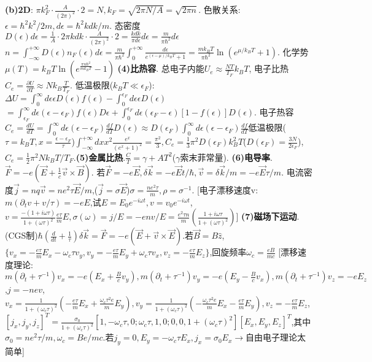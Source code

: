 \documentclass[UTF8,a4paper,10pt,twocolumn]{ctexart}
\begin{document}
 \textbf{(b)2D}:
  $\pi k_F^2\cdot\frac{A}{(2\pi)^2}\cdot 2=N,k_F=\sqrt{2\pi N/A}=\sqrt{2\pi n}$.
  色散关系:$\epsilon=\hbar^2 k^2/2m,d\epsilon=\hbar^2kdk/m$.
  态密度$D(\epsilon)d\epsilon=\frac{1}{A}\cdot2\pi kdk\cdot\frac{A}{(2\pi)^2}\cdot 2=\frac{kdk}{\pi d\epsilon}d\epsilon=\frac{m}{\pi\hbar^2}d\epsilon$$n=\int_{-\infty}^{+\infty}D(\epsilon)n_F(\epsilon)d\epsilon=\frac{m}{\pi\hbar^2}\int_{0}^{+\infty}\frac{d\epsilon}{e^{(\epsilon-\mu)/k_BT}+1}$$=\frac{mk_BT}{\pi\hbar^2}\ln{(e^{\mu/k_BT}+1)}$.
  化学势$\mu(T)=k_BT\ln(e^{\frac{\pi n \hbar^2}{mk_BT}}-1)$
  \textbf{(4)比热容}.
  总电子内能$U_{e}\approx\frac{NT}{T_F}k_B T$,
  电子比热$C_{e}=\frac{\partial U}{\partial T}\approx Nk_B \frac{T}{T_F}$.
  低温极限($k_B T\ll \epsilon_F$):$\Delta U=\int_0^{\infty}d\epsilon\epsilon D(\epsilon)f(\epsilon)-\int_0^{\epsilon_F}d\epsilon\epsilon D(\epsilon)$$=\int_{\epsilon_F}^{\infty}d\epsilon(\epsilon-\epsilon_F)f(\epsilon)D\epsilon + \int_0^{\epsilon_F}d\epsilon(\epsilon_F-\epsilon)[1-f(\epsilon)]D(\epsilon)$.
  电子热容$C_e=\frac{dU}{dT}=\int_{0}^{\infty}d\epsilon(\epsilon-\epsilon_F)\frac{df}{dT}D(\epsilon)\approx D(\epsilon_F)\int_0^{\infty}d\epsilon(\epsilon-\epsilon_F)\frac{df}{dT}$低温极限($\tau=k_B T,x=\frac{\epsilon-\epsilon_F}{\tau}$)$\int_{-\infty}^{+\infty}dxx^2\frac{e^x}{(e^x +1)^2}=\frac{\pi^2}{3},C_e=\frac{1}{3}\pi^2D(\epsilon_F)k_B^2T$($D(\epsilon_F)=\frac{3N}{2\epsilon_F}$),$C_e=\frac{1}{2}\pi^2Nk_BT/T_F$.\textbf{(5)金属比热}.$\frac{C}{T}=\gamma+AT^2$($\gamma$索末菲常量).
  \textbf{(6)电导率}.$\vec{F}=-e(\vec{E}+\frac{1}{c}\vec{v}\times\vec{B})$.
  若$\vec{F}=-e\vec{E},\delta\vec{k}=-e\vec{E}t/\hbar,\vec{v}=\delta\vec{k}/m=-e\vec{E}\tau/m$.
  电流密度$\vec{j}=nq\vec{v}=ne^2\tau\vec{E}/m$,($\vec{j}=\sigma\vec{E}$)$\sigma=\frac{ne^2\tau}{m},\rho=\sigma^{-1}$.
  [电子漂移速度v:$m(\partial_tv+v/\tau)=-eE$,试$E=E_0e^{-i\omega t},v=v_0e^{-i\omega t}$,$v=\frac{-(1+i\omega\tau)}{1+(\omega\tau)^2}\frac{e\tau}{m}E,\sigma(\omega)=j/E=-env/E=\frac{e^2\tau n}{m}(\frac{1+i\omega\tau}{1+(\omega\tau)^2})$]
  \textbf{(7)磁场下运动}.(CGS制)$\hbar(\frac{d}{dt}+\frac{1}{\tau})\delta\vec{k}=\vec{F}=-e(\vec{E}+\vec{v}\times\vec{E})$.若$\vec{B}=B\hat{z}$,$\{v_x=-\frac{e\tau}{m}E_x-\omega_c\tau v_y,v_y=-\frac{e\tau}{m}E_y+\omega_c\tau v_x,v_z=-\frac{e\tau}{m}E_z\}$,回旋频率$\omega_c=\frac{eB}{mc}$
  [漂移速度理论:$m(\partial_t+\tau^{-1})v_x=-e(E_x+\frac{B}{c}v_y),m(\partial_t+\tau^{-1})v_y=-e(E_y-\frac{B}{c}v_x),m(\partial_t+\tau^{-1})v_z=-eE_z$,$j=-nev$,$v_x=\frac{1}{1+(\omega_c\tau)^2}(-\frac{e\tau}{m}E_x+\frac{\omega_c\tau^2e}{m}E_y),v_y=\frac{1}{1+(\omega_c\tau)^2}(-\frac{\omega_c\tau^2e}{m}E_x-\frac{e\tau}{m}E_y),v_z=-\frac{e\tau}{m}E_z$,$[j_x,j_y,j_z]^{T}=\frac{\sigma_0}{1+(\omega_c\tau)^2}[1,-\omega_c\tau,0;\omega_c\tau,1,0;0,0,1+(\omega_c\tau)^2][E_x,E_y,E_z]^{T}$,其中$\sigma_0=ne^2\tau/m,\omega_c=Be/mc$.若$j_y=0,E_y=-\omega_c\tau E_x,j_x=\sigma_0E_x\rightarrow$自由电子理论太简单]
$$
\end{document}
